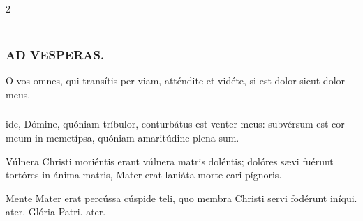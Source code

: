 \documentclass[9pt,twoside]{extarticle}
\begin{document}
\begin{multicols}{2}
\begin{center}\textcolor{red}{\rule{\linewidth}{0.5pt}} \end{center}

\subsection*{\center {}}
\begin{center}\end{center}

\subsubsection*{\center \textsc{AD VESPERAS.}}
\begin{center}\end{center}
\begin{tightlist}{}
\item {} O vos omnes, qui transítis per viam, atténdite et vidéte, si est dolor sicut dolor meus.
\item {}
\end{tightlist}
\subsubsection*{}
ide, Dómine, quóniam tríbulor, conturbátus est venter meus: subvérsum est cor meum in memetípsa, quóniam amaritúdine plena sum.

\begin{tightlist}{}
\item {}
\item {} Vúlnera Christi moriéntis erant vúlnera matris doléntis; dolóres sævi fuérunt tortóres in ánima matris, \textred{*} Mater erat laniáta morte cari pígnoris.
\item {} Mente Mater erat percússa cúspide teli, quo membra Christi servi fodérunt iníqui. ater. Glória Patri. ater.
\end{tightlist}


\end{multicols}
\end{document}
